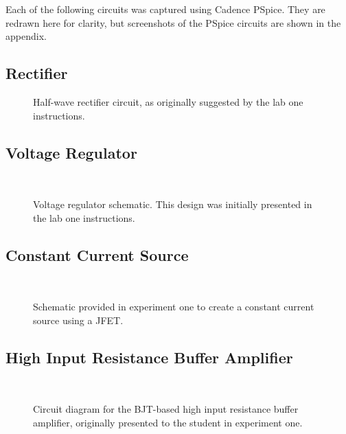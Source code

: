 Each of the following circuits was captured using Cadence PSpice.  They are
redrawn here for clarity, but screenshots of the PSpice circuits are shown in
the appendix.

\subsection{Rectifier}
\begin{figure}[H]
	\centering
	
	\parbox{3.5in}{
	\caption{Half-wave rectifier circuit, as originally suggested by the lab
	one instructions.}
	\label{fig:schem1}}
\end{figure}

\subsection{Voltage Regulator}
\begin{figure}[H]
	\centering
	\\
	\parbox{3.5in}{
	\caption{Voltage regulator schematic.  This design was initially presented
	in the lab one instructions.}
	\label{fig:schem3}}
\end{figure}

\subsection{Constant Current Source}
\begin{figure}[H]
	\centering
	\\
	\parbox{3.5in}{
	\caption{Schematic provided in experiment one to create a constant current source using a JFET.}
	\label{fig:schem4}}
\end{figure}

\subsection{High Input Resistance Buffer Amplifier}
\begin{figure}[H]
	\centering
	\\
	\parbox{3.5in}{
	\caption{Circuit diagram for the BJT-based high input resistance buffer amplifier, originally presented to the student in experiment one.}
	\label{fig:schem5}}
\end{figure}
